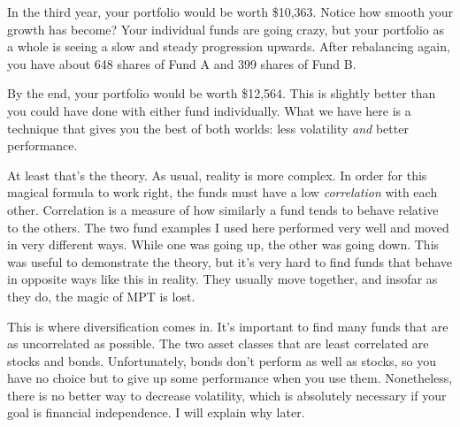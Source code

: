 In the third year, your portfolio would be worth \$10,363. Notice how smooth your growth has become? Your individual funds are going crazy, but your portfolio as a whole is seeing a slow and steady progression upwards. After rebalancing again, you have about 648 shares of Fund A and 399 shares of Fund B.

By the end, your portfolio would be worth \$12,564. This is slightly better than you could have done with either fund individually. What we have here is a technique that gives you the best of both worlds: less volatility \emph{and} better performance.

\begin{figure}
\centering
{}
\end{figure}

At least that's the theory. As usual, reality is more complex. In order for this magical formula to work right, the funds must have a low \emph{correlation} with each other. Correlation is a measure of how similarly a fund tends to behave relative to the others. The two fund examples I used here performed very well and moved in very different ways. While one was going up, the other was going down. This was useful to demonstrate the theory, but it's very hard to find funds that behave in opposite ways like this in reality. They usually move together, and insofar as they do, the magic of MPT is lost.

This is where diversification comes in. It's important to find many funds that are as uncorrelated as possible. The two asset classes that are least correlated are stocks and bonds. Unfortunately, bonds don't perform as well as stocks, so you have no choice but to give up some performance when you use them. Nonetheless, there is no better way to decrease volatility, which is absolutely necessary if your goal is financial independence. I will explain why later.

